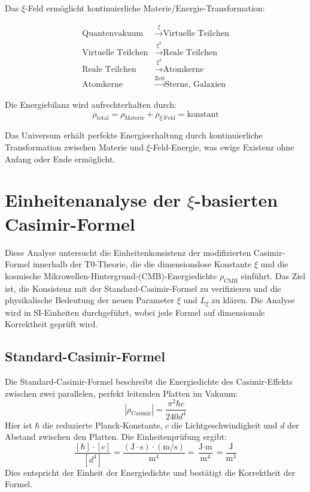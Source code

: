 \documentclass[12pt,a4paper]{article}
\begin{document}
	Das $\xi$-Feld ermöglicht kontinuierliche Materie/Energie-Transformation:
	
	\begin{align}
		\text{Quantenvakuum} &\xrightarrow{\xi} \text{Virtuelle Teilchen} \\
		\text{Virtuelle Teilchen} &\xrightarrow{\xi^2} \text{Reale Teilchen} \\
		\text{Reale Teilchen} &\xrightarrow{\xi^3} \text{Atomkerne} \\
		\text{Atomkerne} &\xrightarrow{\text{Zeit}} \text{Sterne, Galaxien}
	\end{align}
	
	Die Energiebilanz wird aufrechterhalten durch:
	\begin{equation}
		\rho_{\text{total}} = \rho_{\text{Materie}} + \rho_{\xi\text{-Feld}} = \text{konstant}
	\end{equation}
	
	\begin{important}
		Das Universum erhält perfekte Energieerhaltung durch kontinuierliche Transformation zwischen Materie und $\xi$-Feld-Energie, was ewige Existenz ohne Anfang oder Ende ermöglicht.
	\end{important}
	
	\section{Einheitenanalyse der $\xi$-basierten Casimir-Formel}
	
	Diese Analyse untersucht die Einheitenkonsistenz der modifizierten Casimir-Formel innerhalb der T0-Theorie, die die dimensionslose Konstante $\xi$ und die kosmische Mikrowellen-Hintergrund-(CMB)-Energiedichte $\rho_{\text{CMB}}$ einführt. Das Ziel ist, die Konsistenz mit der Standard-Casimir-Formel zu verifizieren und die physikalische Bedeutung der neuen Parameter $\xi$ und $L_\xi$ zu klären. Die Analyse wird in SI-Einheiten durchgeführt, wobei jede Formel auf dimensionale Korrektheit geprüft wird.
	
	\subsection{Standard-Casimir-Formel}
	Die Standard-Casimir-Formel beschreibt die Energiedichte des Casimir-Effekts zwischen zwei parallelen, perfekt leitenden Platten im Vakuum:
	\begin{equation}
		|\rho_{\text{Casimir}}| = \frac{\pi^2 \hbar c}{240 d^4}
	\end{equation}
	Hier ist $\hbar$ die reduzierte Planck-Konstante, $c$ die Lichtgeschwindigkeit und $d$ der Abstand zwischen den Platten. Die Einheitenprüfung ergibt:
	\begin{equation}
		\frac{[\hbar] \cdot [c]}{[d^4]} = \frac{(\text{J} \cdot \text{s}) \cdot (\text{m}/\text{s})}{\text{m}^4} = \frac{\text{J} \cdot \text{m}}{\text{m}^4} = \frac{\text{J}}{\text{m}^3}
	\end{equation}
	Dies entspricht der Einheit der Energiedichte und bestätigt die Korrektheit der Formel.
	
\end{document}
